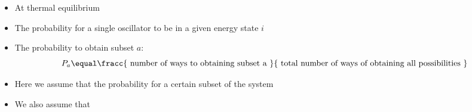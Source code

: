 \begin{frame}
\frametitle{\texorpdfstring{\culine[\sectiontitleulinecolor]{\sectiontitle}}{\sectiontitle} }

\begin{itemize}
	\item At thermal equilibrium

\item The probability for a single oscillator to be in a given energy state $i$  

\item The probability to obtain subset $a$:
\[ 
 P_{a} \equal \fracc{\text { number of ways to obtaining subset a }}{\text { total number of ways of obtaining all possibilities }} 
 \]
\item[] Here we assume that the probability for a certain subset of the system  

\item We also assume that  
%
\end{itemize}

\endofslide 
\end{frame}

